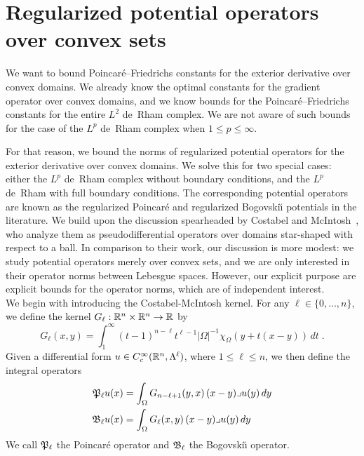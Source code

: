 \documentclass[12pt,a4paper]{article}
\begin{document}
\section{Regularized potential operators over convex sets}\label{section:potentialoperator}

We want to bound Poincar\'e--Friedrichs constants for the exterior derivative over convex domains.
We already know the optimal constants for the gradient operator over convex domains,
and we know bounds for the Poincar\'e--Friedrichs constants for the entire $L^{2}$ de~Rham complex. 
We are not aware of such bounds for the case of the $L^{p}$ de~Rham complex when $1 \leq p \leq \infty$. 

For that reason, we bound the norms of regularized potential operators for the exterior derivative over convex domains.
We solve this for two special cases: either the $L^{p}$ de~Rham complex without boundary conditions, 
and the $L^{p}$ de~Rham with full boundary conditions. 
The corresponding potential operators are known as the regularized Poincar\'e and regularized Bogovski\u{\i} potentials in the literature. 
We build upon the discussion spearheaded by Costabel and McIntosh~\cite{costabel2010bogovskiui},
who analyze them as pseudodifferential operators over domains star-shaped with respect to a ball. 
% 
In comparison to their work, our discussion is more modest:
we study potential operators merely over convex sets, and we are only interested in their operator norms between Lebesgue spaces.
However, our explicit purpose are explicit bounds for the operator norms, which are of independent interest. 
\\



We begin with introducing the Costabel-McIntosh kernel.
For any $\ell \in \{0,\dotsc,n\}$, we define the kernel $G_{\ell} : {\mathbb R}^{n} \times {\mathbb R}^{n} \rightarrow {\mathbb R}$ by
\begin{equation}\label{eq:Gl}
  G_{\ell}(x,y) = \int_{1}^\infty (t-1)^{n-\ell}t^{\ell-1} |\Omega|^{-1}\chi_{\Omega} \left(y+t(x-y)\right)\,dt \;.
\end{equation}
Given a differential form $u \in {C^\infty_c}({\mathbb R}^n,\Lambda^\ell)$, where \(1 \leq \ell \leq n\), 
we then define the integral operators
\begin{align}
  {\mathfrak P}_{\ell} u(x) &= \int_{\Omega} G_{n-\ell+1}(y,x) \,(x-y)\lrcorner u(y)\,dy
  \\
  {\mathfrak B}_{\ell} u(x) &= \int_{\Omega} G_{\ell}(x,y) \,(x-y)\lrcorner u(y)\,dy
\end{align}
We call ${\mathfrak P}_{\ell}$ the Poincar\'e operator and ${\mathfrak B}_{\ell}$ the Bogovski\u{\i} operator. 
\\
\end{document}

